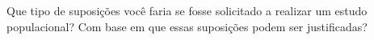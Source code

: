 Que tipo de suposições você faria se fosse solicitado a realizar um estudo populacional? Com base em que essas suposições podem ser justificadas?
